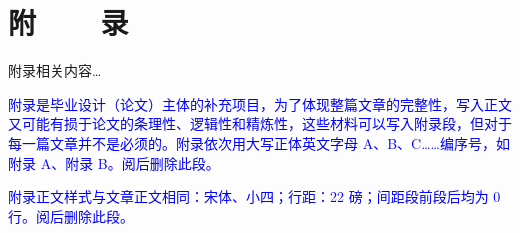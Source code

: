 %
%

\chapter*{\vskip 10bp \textmd{附~~~~录} \vskip -6bp}

附录相关内容…

\textcolor{blue}{附录是毕业设计（论文）主体的补充项目，为了体现整篇文章的完整性，写入正文又可能有损于论文的条理性、逻辑性和精炼性，这些材料可以写入附录段，但对于每一篇文章并不是必须的。附录依次用大写正体英文字母 A、B、C……编序号，如附录 A、附录 B。阅后删除此段。}

\textcolor{blue}{附录正文样式与文章正文相同：宋体、小四；行距：22 磅；间距段前段后均为 0 行。阅后删除此段。}

